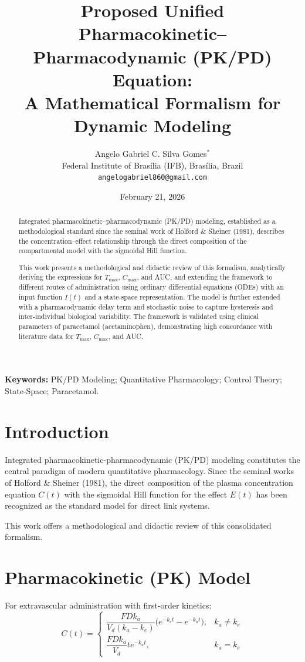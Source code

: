 \documentclass[10pt,a4paper]{article}
\title{Proposed Unified Pharmacokinetic--Pharmacodynamic (PK/PD) Equation:\\
A Mathematical Formalism for Dynamic Modeling}
\author{Angelo Gabriel C. Silva Gomes$^{*}$\\
Federal Institute of Brasília (IFB), Brasília, Brazil\\
\texttt{angelogabriel860@gmail.com}}
\date{February 21, 2026}
\begin{document}
\maketitle

\begin{abstract}
Integrated pharmacokinetic--pharmacodynamic (PK/PD) modeling, established as a methodological standard since the seminal work of Holford \& Sheiner (1981), describes the concentration--effect relationship through the direct composition of the compartmental model with the sigmoidal Hill function.

This work presents a methodological and didactic review of this formalism, analytically deriving the expressions for $T_{\max}$, $C_{\max}$, and AUC, and extending the framework to different routes of administration using ordinary differential equations (ODEs) with an input function $I(t)$ and a state-space representation. The model is further extended with a pharmacodynamic delay term and stochastic noise to capture hysteresis and inter-individual biological variability. The framework is validated using clinical parameters of paracetamol (acetaminophen), demonstrating high concordance with literature data for $T_{\max}$, $C_{\max}$, and AUC.
\end{abstract}

\textbf{Keywords:} PK/PD Modeling; Quantitative Pharmacology; Control Theory; State-Space; Paracetamol.

\section{Introduction}
Integrated pharmacokinetic-pharmacodynamic (PK/PD) modeling constitutes the central paradigm of modern quantitative pharmacology. Since the seminal works of Holford \& Sheiner (1981), the direct composition of the plasma concentration equation $C(t)$ with the sigmoidal Hill function for the effect $E(t)$ has been recognized as the standard model for direct link systems.

This work offers a methodological and didactic review of this consolidated formalism.

\section{Pharmacokinetic (PK) Model}
For extravascular administration with first-order kinetics:
\begin{equation}
C(t) = 
\begin{cases}
\dfrac{F D k_a}{V_d (k_a - k_e)} \bigl(e^{-k_e t} - e^{-k_a t}\bigr), & k_a \neq k_e \\[8pt]
\dfrac{F D k_a}{V_d} t e^{-k_a t}, & k_a = k_e
\end{cases}
\label{eq:pk}
\end{equation}
\end{document}
